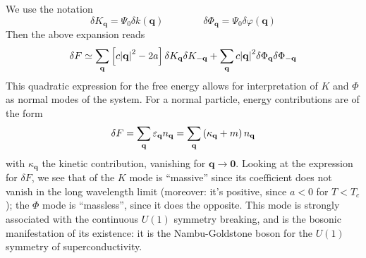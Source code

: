 We use the notation
\[
    \delta K_\mathbf{q} = \Psi_0 \delta k (\mathbf{q})
    \qquad\qquad
    \delta \Phi_\mathbf{q} = \Psi_0 \delta \varphi (\mathbf{q})
\]
Then the above expansion reads
\[
    \delta F \simeq \sum_\mathbf{q} \left[{ c \abs{\mathbf{q}}^2 - 2a }\right] \delta K_\mathbf{q} \delta K_{-\mathbf{q}} +  \sum_\mathbf{q} c \abs{\mathbf{q}}^2 \delta \Phi_\mathbf{q} \delta \Phi_{-\mathbf{q}}
\]
This quadratic expression for the free energy allows for interpretation of $K$ and $\Phi$ as normal modes of the system. For a normal particle, energy contributions are of the form
\[
    \delta F = \sum_\mathbf{q} \varepsilon_\mathbf{q} n_\mathbf{q} = \sum_\mathbf{q} \left({\kappa_\mathbf{q} + m}\right) n_\mathbf{q}
\]
with $\kappa_\mathbf{q}$ the kinetic contribution, vanishing for $\mathbf{q} \to \mathbf{0}$. Looking at the expression for $\delta F$, we see that of the $K$ mode is ``massive'' since its coefficient does not vanish in the long wavelength limit (moreover: it's positive, since $a<0$ for $T<T_c$); the $\Phi$ mode is ``massless'', since it does the opposite. This mode is strongly associated with the continuous $U(1)$ symmetry breaking, and is the bosonic manifestation of its existence: it is the Nambu-Goldstone boson for the $U(1)$ symmetry of superconductivity.

